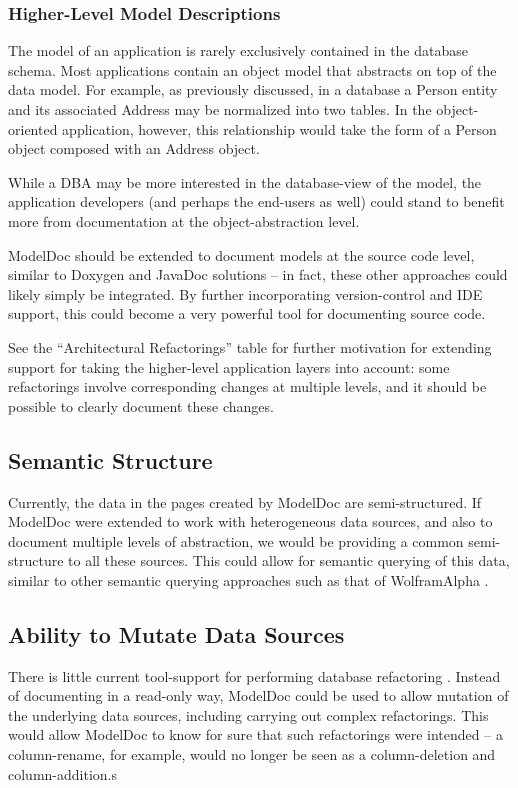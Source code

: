 \documentclass[nocopyrightspace]{acm_proc_article-sp}
\begin{document}
\subsubsection{Higher-Level Model Descriptions}

The model of an application is rarely exclusively contained in the database
schema.  Most applications contain an object model that abstracts on top of the
data model.  For example, as previously discussed, in a database a Person entity and its associated Address
may be normalized into two tables.  In the object-oriented application,
however, this relationship would take the form of a Person object composed with
an Address object.

While a DBA may be more interested in the database-view of the model, the
application developers (and perhaps the end-users as well) could stand to
benefit more from documentation at the object-abstraction level.

ModelDoc should be extended to document models at the source code
level, similar to Doxygen and JavaDoc solutions -- in fact, these other approaches
could likely simply be integrated.  By further incorporating version-control
and IDE support, this could become a very powerful tool for documenting source
code.

See the ``Architectural Refactorings'' table for further motivation for
extending support for taking the higher-level application layers into account:
some refactorings involve corresponding changes at multiple levels, and it
should be possible to clearly document these changes.

\subsection{Semantic Structure}

Currently, the data in the pages created by ModelDoc are semi-structured.  If
ModelDoc were extended to work with heterogeneous data sources, and also to
document multiple levels of abstraction, we would be providing a common
semi-structure to all these sources.  This could allow for semantic querying of
this data, similar to other semantic querying approaches such as that of
WolframAlpha \cite{web:wolfram}.

\subsection{Ability to Mutate Data Sources}

There is little current tool-support for performing database refactoring
\cite{ambler:refactoring}.  Instead of documenting in a read-only way, ModelDoc
could be used to allow mutation of the underlying data sources, including carrying out complex refactorings.  This would allow ModelDoc to know for sure that such
refactorings were intended -- a column-rename, for example, would no longer be
seen as a column-deletion and column-addition.s
\end{document}
